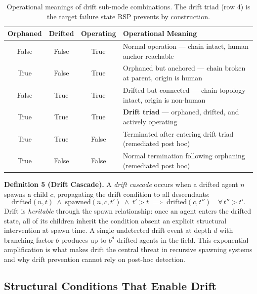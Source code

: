 \begin{table}[h]
\centering
\begin{tabular}{c|c|c|p{5.2cm}}
\textbf{Orphaned} & \textbf{Drifted} & \textbf{Operating} & \textbf{Operational Meaning} \\ \hline
False & False & True  & Normal operation — chain intact, human anchor reachable \\
True  & False & True  & Orphaned but anchored — chain broken at parent, origin is human \\
False & True  & True  & Drifted but connected — chain topology intact, origin is non-human \\
True  & True  & True  & \textbf{Drift triad} — orphaned, drifted, and actively operating \\
True  & True  & False & Terminated after entering drift triad (remediated post hoc) \\
True  & False & False & Normal termination following orphaning (remediated post hoc)
\end{tabular}
\caption{Operational meanings of drift sub-mode combinations. The drift triad (row 4) is the target failure state RSP prevents by construction.}
\label{tab:drift-submodes}
\end{table}

\medskip
\noindent\textbf{Definition 5 (Drift Cascade).}
A \emph{drift cascade} occurs when a drifted agent $n$ spawns a child $c$, propagating the drift condition to all descendants:
\begin{equation}
\text{drifted}(n, t) \;\land\; \text{spawned}(n, c, t') \;\land\; t' > t \;\implies\; \text{drifted}(c, t'') \quad \forall\, t'' > t'.
\label{eq:drift-cascade}
\end{equation}
Drift is \emph{heritable} through the spawn relationship: once an agent enters the drifted state, all of its children inherit the condition absent an explicit structural intervention at spawn time. A single undetected drift event at depth $d$ with branching factor $b$ produces up to $b^d$ drifted agents in the field. This exponential amplification is what makes drift the central threat in recursive spawning systems and why drift prevention cannot rely on post-hoc detection.

\subsection{Structural Conditions That Enable Drift}
\label{sec:drift-conditions}

